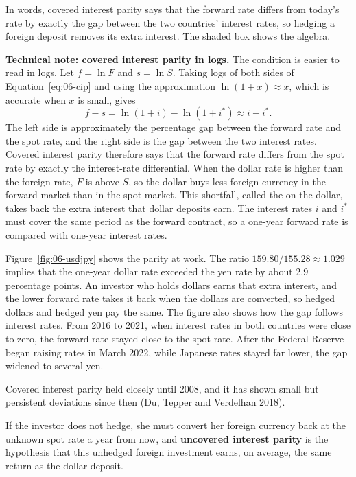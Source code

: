In words, covered interest parity says that the forward rate differs from today's rate by exactly the gap between the two countries' interest rates, so hedging a foreign deposit removes its extra interest. The shaded box shows the algebra.

\begin{technote}
\textbf{Technical note: covered interest parity in logs.} The condition is easier to read in logs. Let $f = \ln F$ and $s = \ln S$. Taking logs of both sides of Equation~\eqref{eq:06-cip} and using the approximation $\ln(1+x) \approx x$, which is accurate when $x$ is small, gives
\begin{equation}
  f - s = \ln(1+i) - \ln(1+i^*) \approx i - i^*.
  \label{eq:06-cip-log}
\end{equation}
The left side is approximately the percentage gap between the forward rate and the spot rate, and the right side is the gap between the two interest rates. Covered interest parity therefore says that the forward rate differs from the spot rate by exactly the interest-rate differential. When the dollar rate is higher than the foreign rate, $F$ is above $S$, so the dollar buys less foreign currency in the forward market than in the spot market. This shortfall, called the  on the dollar, takes back the extra interest that dollar deposits earn. The interest rates $i$ and $i^*$ must cover the same period as the forward contract, so a one-year forward rate is compared with one-year interest rates.
\end{technote}


Figure~\ref{fig:06-usdjpy} shows the parity at work. The ratio $159.80/155.28 \approx 1.029$ implies that the one-year dollar rate exceeded the yen rate by about 2.9 percentage points. An investor who holds dollars earns that extra interest, and the lower forward rate takes it back when the dollars are converted, so hedged dollars and hedged yen pay the same. The figure also shows how the gap follows interest rates. From 2016 to 2021, when interest rates in both countries were close to zero, the forward rate stayed close to the spot rate. After the Federal Reserve began raising rates in March 2022, while Japanese rates stayed far lower, the gap widened to several yen.

Covered interest parity held closely until 2008, and it has shown small but persistent deviations since then (Du, Tepper and Verdelhan 2018).

If the investor does not hedge, she must convert her foreign currency back at the unknown spot rate a year from now, and \textbf{uncovered interest parity} is the hypothesis that this unhedged foreign investment earns, on average, the same return as the dollar deposit.

